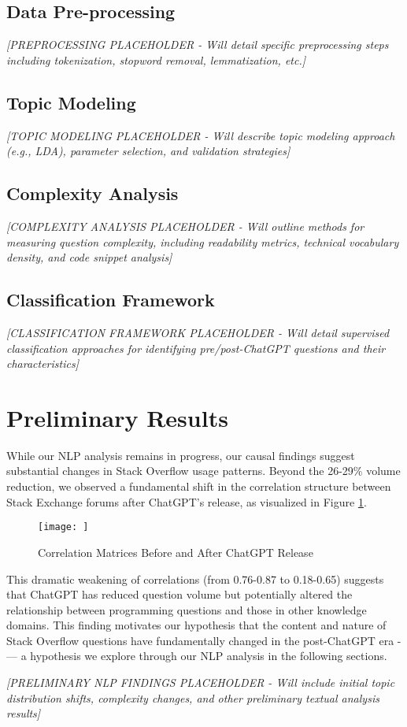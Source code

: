 \subsection{Data Pre-processing}
\textit{[PREPROCESSING PLACEHOLDER - Will detail specific preprocessing steps including tokenization, stopword removal, lemmatization, etc.]}

\subsection{Topic Modeling}
\textit{[TOPIC MODELING PLACEHOLDER - Will describe topic modeling approach (e.g., LDA), parameter selection, and validation strategies]}

\subsection{Complexity Analysis}
\textit{[COMPLEXITY ANALYSIS PLACEHOLDER - Will outline methods for measuring question complexity, including readability metrics, technical vocabulary density, and code snippet analysis]}

\subsection{Classification Framework}
\textit{[CLASSIFICATION FRAMEWORK PLACEHOLDER - Will detail supervised classification approaches for identifying pre/post-ChatGPT questions and their characteristics]}

\section{Preliminary Results}
While our NLP analysis remains in progress, our causal findings suggest substantial changes in Stack Overflow usage patterns. Beyond the 26-29\% volume reduction, we observed a fundamental shift in the correlation structure between Stack Exchange forums after ChatGPT's release, as visualized in Figure \ref{fig:correlation_matrix}.

\begin{figure}[htpb!]
    \centering
    \texttt{[image: ]}
    \caption{Correlation Matrices Before and After ChatGPT Release}
    \label{fig:correlation_matrix}
\end{figure}

This dramatic weakening of correlations (from 0.76-0.87 to 0.18-0.65) suggests that ChatGPT has reduced question volume but potentially altered the relationship between programming questions and those in other knowledge domains. This finding motivates our hypothesis that the content and nature of Stack Overflow questions have fundamentally changed in the post-ChatGPT era -— a hypothesis we explore through our NLP analysis in the following sections.

\textit{[PRELIMINARY NLP FINDINGS PLACEHOLDER - Will include initial topic distribution shifts, complexity changes, and other preliminary textual analysis results]}